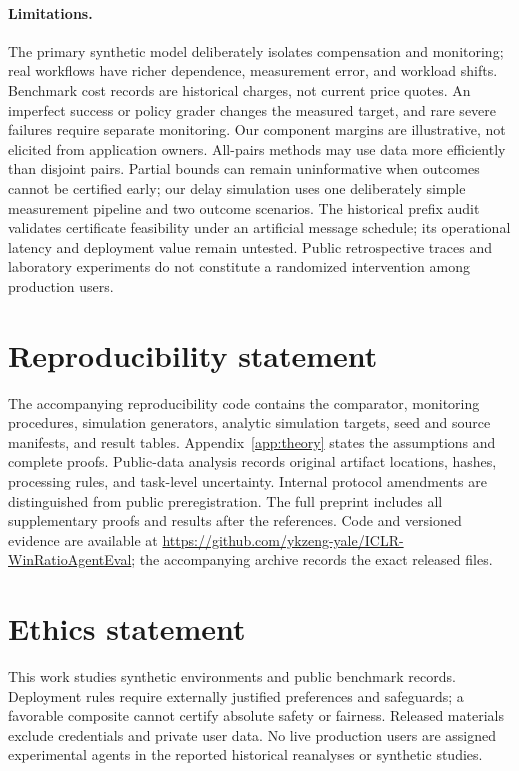 \documentclass[11pt,letterpaper]{article}
\begin{document}
\paragraph{Limitations.}
The primary synthetic model deliberately isolates compensation and
monitoring; real workflows have richer dependence, measurement error,
and workload shifts. Benchmark cost records are historical charges, not
current price quotes. An imperfect success or policy grader changes the
measured target, and rare severe failures require separate monitoring.
Our component margins are illustrative, not elicited from application
owners. All-pairs methods may use data more efficiently than disjoint
pairs. Partial bounds can remain uninformative when outcomes cannot be
certified early; our delay simulation uses one deliberately simple
measurement pipeline and two outcome scenarios. The historical prefix
audit validates certificate feasibility under an artificial message
schedule; its operational latency and deployment value remain untested. Public
retrospective traces and laboratory experiments do not constitute a
randomized intervention among production users.

\section*{Reproducibility statement}
The accompanying reproducibility code contains the comparator, monitoring procedures,
simulation generators, analytic simulation targets, seed and source
manifests, and result tables. Appendix~\ref{app:theory} states the
assumptions and complete proofs. Public-data analysis records original
artifact locations, hashes, processing rules, and task-level uncertainty.
Internal protocol amendments are distinguished from public preregistration.
The full preprint includes all supplementary proofs and results after the references. Code and versioned evidence are available at \url{https://github.com/ykzeng-yale/ICLR-WinRatioAgentEval}; the accompanying archive records the exact released files.

\section*{Ethics statement}
This work studies synthetic environments and public benchmark records.
Deployment rules require externally justified preferences and safeguards;
a favorable composite cannot certify absolute safety or fairness.
Released materials exclude credentials and private user data. No live
production users are assigned experimental agents in the reported
historical reanalyses or synthetic studies.
\end{document}
